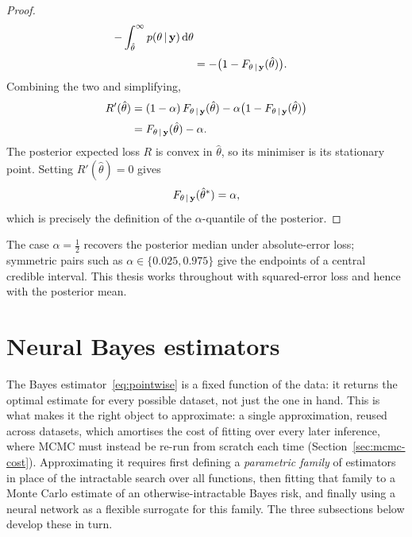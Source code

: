 \begin{proof}
\begin{align}
   - \int_{\hat{\theta}}^{\infty}
     p(\theta \,|\, \mathbf{y}) \,\mathrm{d}\theta
   \notag\\[2pt]
  &= -\big(1 - F_{\theta \,|\, \mathbf{y}}(\hat{\theta})\big).
\end{align}
%
Combining the two and simplifying,
%
\begin{align}
  R'(\hat{\theta})
  &= (1-\alpha)\,F_{\theta \,|\, \mathbf{y}}(\hat{\theta})
   - \alpha\big(1 - F_{\theta \,|\, \mathbf{y}}(\hat{\theta})\big)
   \notag\\[2pt]
  &= F_{\theta \,|\, \mathbf{y}}(\hat{\theta}) - \alpha.
\end{align}
%
The posterior expected loss $R$ is convex in $\hat{\theta}$, so its
minimiser is its stationary point. Setting $R'(\hat{\theta}) = 0$
gives
%
\begin{equation}
  F_{\theta \,|\, \mathbf{y}}(\hat{\theta}^{*}) = \alpha,
\end{equation}
%
which is precisely the definition of the $\alpha$-quantile of the
posterior.
\end{proof}

The case $\alpha = \tfrac{1}{2}$ recovers the posterior median under
absolute-error loss; symmetric pairs such as $\alpha \in
\{0.025, 0.975\}$ give the endpoints of a central credible interval.
This thesis works throughout with squared-error loss and hence with
the posterior mean.


\section{Neural Bayes estimators}
\label{sec:nbe}

The Bayes estimator~\eqref{eq:pointwise} is a fixed function of the data: it returns the optimal estimate for every possible dataset, not just the one in hand. This is what makes it the right object to approximate: a single approximation, reused across datasets, which amortises the cost of fitting over every later inference, where MCMC must instead be re-run from scratch each time (Section~\ref{sec:mcmc-cost}). Approximating it requires first defining a \emph{parametric family} of estimators in place of the intractable search over all functions, then fitting that family to a Monte Carlo estimate of an otherwise-intractable Bayes risk, and finally using a neural network as a flexible surrogate for this family. The three subsections below develop these in turn.

